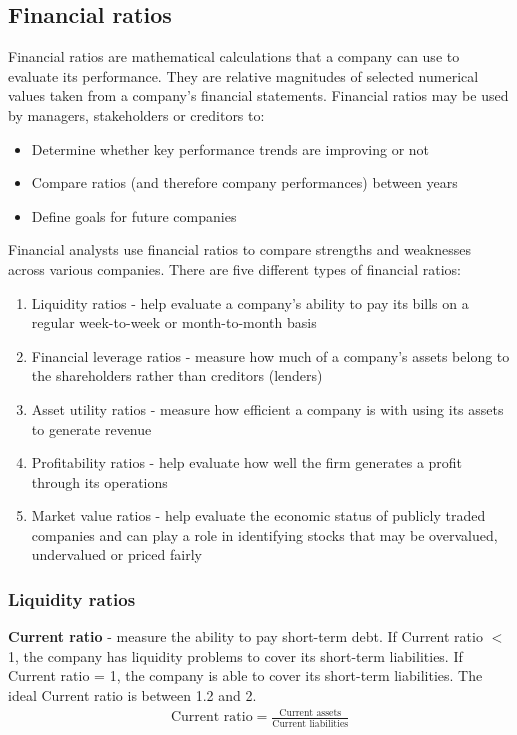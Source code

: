 \subsection{Financial ratios}
Financial ratios are mathematical calculations that a company can use to evaluate its performance. They are relative magnitudes of selected numerical values taken from a company's financial statements. Financial ratios may be used by managers, stakeholders or creditors to:
\begin{itemize}
    \item Determine whether key performance trends are improving or not
    \item Compare ratios (and therefore company performances) between years
    \item Define goals for future companies
\end{itemize}
Financial analysts use financial ratios to compare strengths and weaknesses across various companies. There are five different types of financial ratios:
\begin{enumerate}
    \item Liquidity ratios - help evaluate a company's ability to pay its bills on a regular week-to-week or month-to-month basis
    \item Financial leverage ratios - measure how much of a company's assets belong to the shareholders rather than creditors (lenders)
    \item Asset utility ratios - measure how efficient a company is with using its assets to generate revenue
    \item Profitability ratios - help evaluate how well the firm generates a profit through its operations
    \item Market value ratios - help evaluate the economic status of publicly traded companies and can play a role in identifying stocks that may be overvalued, undervalued or priced fairly
\end{enumerate}
\subsubsection{Liquidity ratios}
\textbf{Current ratio} - measure the ability to pay short-term debt. If Current ratio $<$ 1, the company has liquidity problems to cover its short-term liabilities. If Current ratio = 1, the company is able to cover its short-term liabilities. The ideal Current ratio is between 1.2 and 2.
\begin{gather}
    \textrm{Current ratio} = \frac{\textrm{Current assets}}{\textrm{Current liabilities}}
\end{gather}

